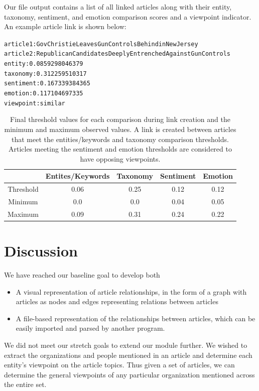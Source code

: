 \documentclass[12pt]{article}
\begin{document}
Our file output contains a list of all linked articles along with their entity, taxonomy, sentiment, and emotion comparison scores and a viewpoint indicator. An example article link is shown below:
\begin{alltt}
article 1: GovChristieLeavesGunControlsBehindinNewJersey
article 2: RepublicanCandidatesDeeplyEntrenchedAgainstGunControls
entity:    0.0859298046379
taxonomy:  0.312259510317
sentiment: 0.167339384365
emotion:   0.117104697335
viewpoint: similar
\end{alltt}

\begin{table}
	\begin{tabular}{|c|c|c|c|c|}\hline
		 & Entites/Keywords & Taxonomy & Sentiment & Emotion\\\hline
		Threshold & 0.06 & 0.25 & 0.12 & 0.12\\\hline
		Minimum & 0.0 & 0.0 & 0.04 & 0.05\\\hline
		Maximum & 0.09 & 0.31 & 0.24 & 0.22 \\\hline
	\end{tabular}
	\caption{Final threshold values for each comparison during link creation and the minimum and maximum observed values. A link is created between articles that meet the entities/keywords and taxonomy comparison thresholds. Articles meeting the sentiment and emotion thresholds are considered to have opposing viewpoints.}
	\label{table:thresholds}
\end{table}

\section{Discussion}
We have reached our baseline goal to develop both 
\begin{itemize}
\item A visual representation of article relationships, in the form of a graph with articles as nodes and edges representing relations between articles
\item A file-based representation of the relationships between articles, which can be easily imported and parsed by another program.
\end{itemize}
We did not meet our stretch goals to extend our module further. We wished to extract the organizations and people mentioned in an article and determine each entity's viewpoint on the article topics. Thus given a set of articles, we can determine the general viewpoints of any particular organization mentioned across the entire set.
\end{document}

